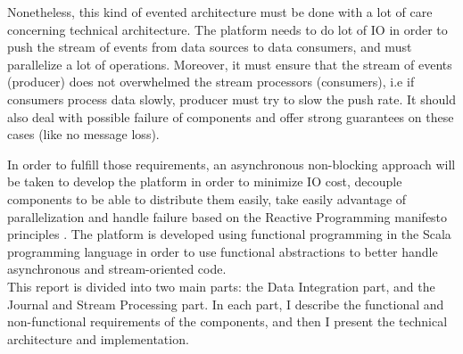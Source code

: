 Nonetheless, this kind of evented architecture must be done with a lot of care concerning technical architecture.
The platform needs to do lot of IO in order to push the stream of events from data sources to data consumers, and must
parallelize a lot of operations. Moreover, it must ensure that the stream of events (producer) does not overwhelmed the stream
processors (consumers), i.e if consumers process data slowly, producer must try to slow the push rate. It should also deal with possible
failure of components and offer strong guarantees on these cases (like no message loss).

In order to fulfill those requirements, an asynchronous non-blocking approach will be taken to develop the platform in order to
minimize IO cost, decouple components to be able to distribute them easily, take easily advantage of parallelization and handle failure based on the 
Reactive Programming manifesto principles . The platform is developed using functional programming in
the Scala programming language  in order to use functional abstractions to better handle asynchronous and stream-oriented code.
\\

This report is divided into two main parts: the Data Integration part, and the Journal and Stream Processing part.
In each part, I describe the functional and non-functional requirements of the components, and then I present the technical architecture
and implementation.

